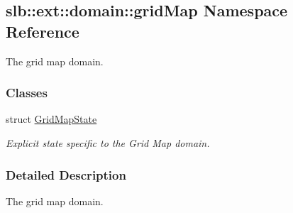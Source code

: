 \hypertarget{namespaceslb_1_1ext_1_1domain_1_1gridMap}{}\subsection{slb\+:\+:ext\+:\+:domain\+:\+:grid\+Map Namespace Reference}
\label{namespaceslb_1_1ext_1_1domain_1_1gridMap}


The grid map domain.  


\subsubsection*{Classes}
\begin{DoxyCompactItemize}
\item 
struct \hyperlink{structslb_1_1ext_1_1domain_1_1gridMap_1_1GridMapState}{Grid\+Map\+State}
\begin{DoxyCompactList}\small\item\em Explicit state specific to the Grid Map domain. \end{DoxyCompactList}\end{DoxyCompactItemize}


\subsubsection{Detailed Description}
The grid map domain. 